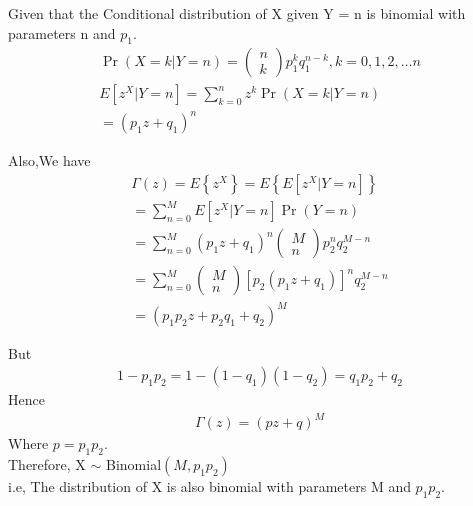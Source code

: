 \documentclass{beamer}
\providecommand{\brak}[1]{\ensuremath{\left(#1\right)}}
\providecommand{\pr}[1]{\ensuremath{\Pr\left(#1\right)}}
\providecommand{\cbrak}[1]{\ensuremath{\left\{#1\right\}}}
\newcommand{\myvec}[1]{\ensuremath{\begin{pmatrix}#1\end{pmatrix}}}
\begin{document}
\begin{frame}
Given that the Conditional distribution of X given Y = n is binomial with parameters n and 
$p_1$.
\begin{multline}
\pr{X=k|Y=n}=\myvec{n \\ k}p_1^kq_1^{n-k} ,k=0,1,2,\dots n\\
E[z^{X}|Y=n]=\sum_{k=0}^n z^{k}\pr{X=k|Y=n}\\
=\brak{p_1 z+q_1}^n
\end{multline}
\end{frame}
\begin{frame}
Also,We have
\begin{align}
\Gamma(z)=E\cbrak{z^{X}}=E\cbrak{E[z^{X}|Y=n]}\\
=\sum_{n=0}^M E[z^{X}|Y=n]\pr{Y=n}\\
=\sum_{n=0}^M \brak{p_1 z+q_1}^n \myvec{M \\ n}p_2^nq_2^{M-n}\\
=\sum_{n=0}^M\myvec{M \\ n}[p_2\brak{p_1 z+q_1}]^n q_2^{M-n}\\
=\brak{{p_1p_2 z+p_2q_1+q_2}}^M
\end{align}
\end{frame}
\begin{frame}
But
\begin{align}
1-p_1p_2 = 1-\brak{1-q_1}\brak{1-q_2} = q_1p_2+q_2
\end{align}
Hence
\begin{align}
\Gamma(z)=\brak{pz+q}^M
\end{align}
Where $p=p_1p_2$.\\ Therefore,
X $\sim$ Binomial$\brak{M,p_1p_2}$ \\i.e,
The distribution of X is also binomial with parameters M and $p_1p_2$.
\end{frame}
\end{document}
